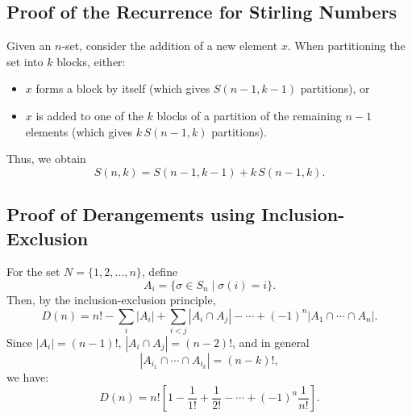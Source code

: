 \documentclass{article}
\begin{document}
\subsection*{Proof of the Recurrence for Stirling Numbers}
Given an $n$-set, consider the addition of a new element $x$. When partitioning the set into $k$ blocks, either:
\begin{itemize}[nosep]
    \item $x$ forms a block by itself (which gives $S(n-1,k-1)$ partitions), or
    \item $x$ is added to one of the $k$ blocks of a partition of the remaining $n-1$ elements (which gives $k\, S(n-1,k)$ partitions).
\end{itemize}
Thus, we obtain
\[
S(n,k) = S(n-1,k-1) + k\, S(n-1,k).
\]

\subsection*{Proof of Derangements using Inclusion-Exclusion}
For the set $N=\{1,2,\ldots,n\}$, define
\[
A_i = \{\sigma \in S_n \mid \sigma(i) = i\}.
\]
Then, by the inclusion-exclusion principle,
\[
D(n) = n! - \sum_{i} |A_i| + \sum_{i<j} |A_i \cap A_j| - \cdots + (-1)^n |A_1 \cap \cdots \cap A_n|.
\]
Since $|A_i| = (n-1)!$, $|A_i \cap A_j| = (n-2)!$, and in general
\[
|A_{i_1} \cap \cdots \cap A_{i_k}| = (n-k)!,
\]
we have:
\[
D(n) = n! \left[ 1 - \frac{1}{1!} + \frac{1}{2!} - \cdots + (-1)^n \frac{1}{n!} \right].
\]
\end{document}
